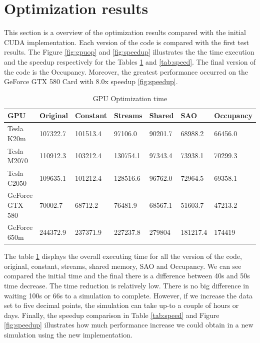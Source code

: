 \section{Optimization results}

This section is a overview of the optimization results compared with the initial CUDA implementation. Each version of the code is compared with the first test results. The Figure \ref{fig:gpuop} and \ref{fig:speedup} illustrates the the time execution and the speedup respectively for the Tables \ref{tab:time} and \ref{tab:speed}. The final version of the code is the Occupancy. Moreover, the greatest performance occurred on the GeForce GTX 580 Card with 8.0x speedup \ref{fig:speedup}.

\begin{table}[h]
\centering
  \begin{tabular} { |  l  |  l | l  |  l  | l | l | l |}
    \hline
    GPU & Original & Constant & Streams & Shared & SAO & Occupancy \\
    \hline
    Tesla K20m & 107322.7 & 101513.4 & 97106.0 & 90201.7 & 68988.2 & 66456.0\\
   \hline
    Tesla M2070 & 110912.3 & 103212.4 & 130754.1 & 97343.4 & 73938.1 & 70299.3\\
    \hline
    Tesla C2050 & 109635.1 & 101212.4 & 128516.6 & 96762.0 & 72964.5 & 69358.1\\
   \hline
    GeForce GTX 580 & 70002.7 & 68712.2 & 76481.9 & 68567.1 & 51603.7 & 47213.2\\
   \hline
    GeForce 650m & 244372.9 & 237371.9 & 227237.8 & 279804 & 181217.4 & 174419\\
   \hline
  \end{tabular}
    \caption{GPU Optimization time}
  \label{tab:time}
  \end{table}
  
  The table \ref{tab:time} displays the overall executing time for all the version of the code, original, constant, streams, shared memory, SAO and Occupancy. We can see compared the initial time and the final there is a difference between 40s and 50s time decrease. The time reduction is relatively low. There is no big difference in waiting 100s or 66s to a simulation to complete. However, if we increase the data set to five decimal points, the simulation can take up-to a couple of hours or days. Finally, the speedup comparison in Table \ref{tab:speed} and Figure \ref{fig:speedup} illustrates how much performance increase we could obtain in a new simulation using the new implementation.
  

